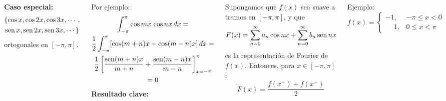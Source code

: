 \documentclass[9pt, aspectratio=169]{beamer}
\begin{document}
\begin{frame}
\begin{columns}[t]
\cx
\textbf{Caso especial:}
\begin{multline*}
\{\cos x, \cos 2x, \cos 3x, \cdots, \\
\operatorname{sen} x, \operatorname{sen} 2x, \operatorname{sen} 3x,  \cdots \} 
\end{multline*}
ortogonales en $[-\pi, \pi]$.

Por ejemplo:
\begin{multline*}
\int_{-\pi}^{\pi} \cos mx \, \cos nx \, dx = \\
\frac{1}{2} \int_{-\pi}^{\pi} [\cos(m + n) x + \cos(m - n) x] \, dx = \\
\frac{1}{2} \left[ \frac{\operatorname{sen}(m + n) x}{m + n} + \frac{\operatorname{sen}(m-n) x}{m - n} \right]_{x = -\pi}^{\pi} \\
= 0
\end{multline*}
\cx
\textbf{Resultado clave:}

Supongamos que $f(x)$ sea suave a tramos en $[-\pi, \pi]$, y que
\[ F(x) = \sum_{n = 0}^{\infty} a_n \cos nx + \sum_{n = 0}^{\infty} b_n \operatorname{sen} nx \]
es la representación de Fourier de $f(x)$. Entonces, para $x \in [-\pi, \pi]$:
\[ F(x) = \frac{f(x^+) + f(x^-)}{2} \]

\begin{exampleblock}{Ejemplo:}
    \begin{equation*}
        f(x) = \begin{cases}
            -1, &-\pi \leq x < 0 \\
            \phantom{-}1, &0 \leq x < \pi
        \end{cases}
    \end{equation*}
\end{exampleblock}
\end{columns}
\end{frame}
\end{document}
